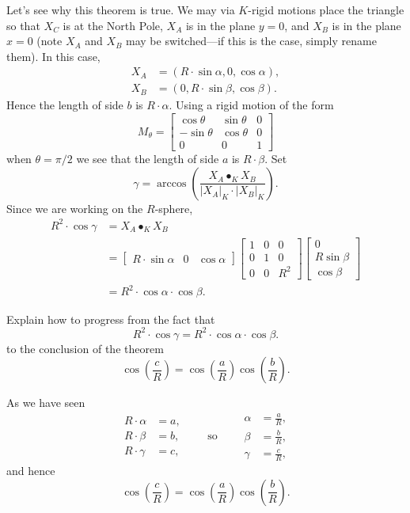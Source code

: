 \documentclass{ximera}
\begin{document}
Let's see why this theorem is true.  We may via $K$-rigid motions
place the triangle so that $X_C$ is at the North Pole, $X_A$ is in the
plane $y=0$, and $X_B$ is in the plane $x=0$ (note $X_A$ and $X_B$ may
be switched---if this is the case, simply rename them). In this case,
\begin{align*}
  X_A &= (R\cdot \sin\alpha, 0, \cos\alpha),\\
  X_B &= (0, R\cdot \sin \beta, \cos\beta).
\end{align*}
Hence the length of side $b$ is $R\cdot\alpha$. Using a rigid motion of the form
\[
M_\theta=
\begin{bmatrix}
  \cos\theta & \sin\theta & 0\\
  -\sin\theta & \cos\theta & 0\\
  0 & 0 & 1
\end{bmatrix}
\]
when $\theta = \pi/2$ we see that the length of side $a$ is $R\cdot
\beta$. Set
\[
\gamma = \arccos\left(\frac{X_A\bullet_K X_B}{|X_A|_K\cdot |X_B|_K}\right).
\]
Since we are working on the $R$-sphere,
\begin{align*}
  R^2\cdot \cos \gamma &= X_A\bullet_K X_B\\
  &=
  \begin{bmatrix}
    R\cdot \sin\alpha &  0 & \cos\alpha
  \end{bmatrix}
    \begin{bmatrix}
      1 & 0 & 0\\
      0 & 1 & 0\\
      0 & 0 & R^2
    \end{bmatrix}
    \begin{bmatrix}
      0\\
      R\sin\beta\\
      \cos\beta
    \end{bmatrix}\\
   &=R^2 \cdot \cos\alpha \cdot \cos\beta.
  \end{align*}
\begin{problem}
  Explain how to progress from the fact that
  \[
  R^2\cdot \cos \gamma = R^2 \cdot \cos\alpha \cdot \cos\beta.
  \]
  to the conclusion of the theorem
  \[
  \cos\left(\frac{c}{R}\right)=\cos\left(\frac{a}{R}\right)\cos\left(\frac{b}{R}\right).
  \]
  \begin{freeResponse}
    As we have seen
    \[
    \begin{split}
      R\cdot \alpha &= a,\\
      R\cdot \beta  &= b,\\
      R\cdot \gamma &= c,
    \end{split}
    \qquad\text{so}\qquad
    \begin{split}
      \alpha &= \frac{a}{R},\\
      \beta  &= \frac{b}{R},\\
      \gamma &= \frac{c}{R},
    \end{split}
    \]
    and hence
    \[
    \cos\left(\frac{c}{R}\right)=\cos\left(\frac{a}{R}\right)\cos\left(\frac{b}{R}\right).
    \]
  \end{freeResponse}
\end{problem}
\end{document}
